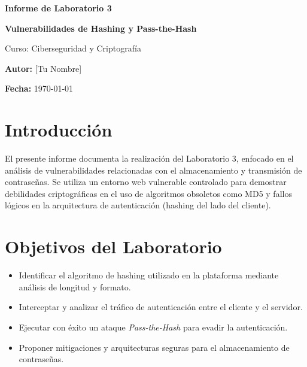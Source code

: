 \documentclass[12pt,a4paper]{article}
\begin{document}
\begin{titlepage}
    \centering
    \vspace*{2cm}
    
    {\Huge\bfseries Informe de Laboratorio 3\par}
    \vspace{1cm}
    {\Large\bfseries Vulnerabilidades de Hashing y Pass-the-Hash\par}
    \vspace{1.5cm}
    
    {\large Curso: Ciberseguridad y Criptografía\par}
    \vspace{2cm}
    
    {\large \textbf{Autor:} [Tu Nombre]\par}
    {\large \textbf{Fecha:} \today\par}
    
    \vfill
    
    
\end{titlepage}

\tableofcontents
\newpage

\section{Introducción}
El presente informe documenta la realización del Laboratorio 3, enfocado en el análisis de vulnerabilidades relacionadas con el almacenamiento y transmisión de contraseñas. Se utiliza un entorno web vulnerable controlado para demostrar debilidades criptográficas en el uso de algoritmos obsoletos como MD5 y fallos lógicos en la arquitectura de autenticación (hashing del lado del cliente).

\section{Objetivos del Laboratorio}
\begin{itemize}
    \item Identificar el algoritmo de hashing utilizado en la plataforma mediante análisis de longitud y formato.
    \item Interceptar y analizar el tráfico de autenticación entre el cliente y el servidor.
    \item Ejecutar con éxito un ataque \textit{Pass-the-Hash} para evadir la autenticación.
    \item Proponer mitigaciones y arquitecturas seguras para el almacenamiento de contraseñas.
\end{itemize}
\end{document}
